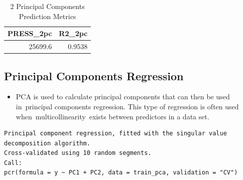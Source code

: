 \documentclass[
  letterpaper,
  DIV=11,
  numbers=noendperiod]{scrreprt}
\newenvironment{Shaded}{\begin{snugshade}}{\end{snugshade}}
\newcommand{\AttributeTok}[1]{\textcolor[rgb]{0.40,0.45,0.13}{#1}}
\newcommand{\CommentTok}[1]{\textcolor[rgb]{0.37,0.37,0.37}{#1}}
\newcommand{\DecValTok}[1]{\textcolor[rgb]{0.68,0.00,0.00}{#1}}
\newcommand{\FunctionTok}[1]{\textcolor[rgb]{0.28,0.35,0.67}{#1}}
\newcommand{\NormalTok}[1]{\textcolor[rgb]{0.00,0.23,0.31}{#1}}
\newcommand{\OtherTok}[1]{\textcolor[rgb]{0.00,0.23,0.31}{#1}}
\newcommand{\SpecialCharTok}[1]{\textcolor[rgb]{0.37,0.37,0.37}{#1}}
\newcommand{\StringTok}[1]{\textcolor[rgb]{0.13,0.47,0.30}{#1}}
\providecommand{\tightlist}{%
  \setlength{\itemsep}{0pt}\setlength{\parskip}{0pt}}\usepackage{longtable,booktabs,array}
\begin{document}
\begin{table}

\caption{2 Principal Components Prediction Metrics}
\centering
\begin{tabular}[t]{r|r}
\hline
PRESS\_2pc & R2\_2pc\\
\hline
25699.6 & 0.9538\\
\hline
\end{tabular}
\end{table}

\hypertarget{principal-components-regression}{%
\subsection{\texorpdfstring{\textbf{Principal Components
Regression}}{Principal Components Regression}}\label{principal-components-regression}}

\begin{itemize}
\tightlist
\item
  PCA is used to calculate principal components that can then be used
  in~principal components regression. This type of regression is often
  used when~multicollinearity~exists between predictors in a data set.
\end{itemize}

\begin{Shaded}
\end{Shaded}

\begin{verbatim}
Principal component regression, fitted with the singular value decomposition algorithm.
Cross-validated using 10 random segments.
Call:
pcr(formula = y ~ PC1 + PC2, data = train_pca, validation = "CV")
\end{verbatim}

\begin{Shaded}
\end{Shaded}
\end{document}
